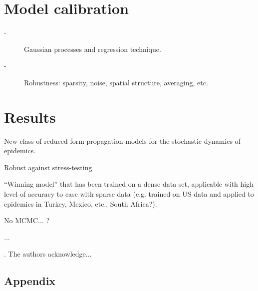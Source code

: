 \documentclass[11pt,a4paper,amssymb,amsmath, tightenlines]{article}
\numberwithin{equation}{section}
\begin{document}
\section{Model calibration}
\begin{description}
	\item[-] Gaussian processes and regression technique.
	\item[-] Robustness: sparsity, noise, spatial structure, averaging, etc.
\end{description}
\section{Results}
\begin{description}
	\item[-] New class of reduced-form propagation models for the stochastic dynamics of epidemics.
	\item[-] Robust against stress-testing
	\item[-] ``Winning model'' that has been trained on a dense data set, applicable with high level of accuracy to case with sparse data (e.g. trained on US data and applied to epidemics in Turkey, Mexico, etc., South Africa?).
	\item[-] No MCMC... ?
	\item ... 
\end{description}
\vspace{0cm}
. The authors acknowledge...


\vspace{.5cm}
\begin{appendix}
\section{Appendix}
\end{appendix}
\end{document}
